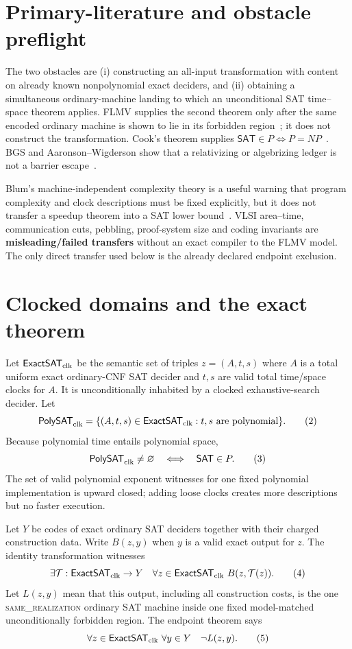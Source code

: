 \documentclass[11pt]{article}
\newcommand{\SAT}{\mathsf{SAT}}
\newcommand{\ExactSAT}{\mathsf{ExactSAT}_{\rm clk}}
\newcommand{\PolySAT}{\mathsf{PolySAT}_{\rm clk}}
\newcommand{\same}{\textsc{same\_realization}}
\begin{document}
\section{Primary-literature and obstacle preflight}
The two obstacles are (i) constructing an all-input transformation with
content on already known nonpolynomial exact deciders, and (ii) obtaining a
simultaneous ordinary-machine landing to which an unconditional SAT
time--space theorem applies.  FLMV supplies the second theorem only after the
same encoded ordinary machine is shown to lie in its forbidden
region~\cite{FLMV05}; it does not construct the transformation.  Cook's
theorem supplies $\SAT\in P\Leftrightarrow P=NP$~\cite{Cook71}.  BGS and
Aaronson--Wigderson show that a relativizing or algebrizing ledger is not a
barrier escape~\cite{BGS75,AW09}.

Blum's machine-independent complexity theory is a useful warning that program
complexity and clock descriptions must be fixed explicitly, but it does not
transfer a speedup theorem into a SAT lower bound~\cite{Blum67}.  VLSI
area--time, communication cuts, pebbling, proof-system size and coding
invariants are \textbf{misleading/failed transfers} without an exact compiler
to the FLMV model.  The only direct transfer used below is the already
declared endpoint exclusion.

\section{Clocked domains and the exact theorem}
Let $\ExactSAT$ be the semantic set of triples
$z=(A,t,s)$ where $A$ is a total uniform exact ordinary-CNF SAT decider and
$t,s$ are valid total time/space clocks for $A$.  It is unconditionally
inhabited by a clocked exhaustive-search decider.  Let
\[
 \PolySAT=\{(A,t,s)\in\ExactSAT:t,s\text{ are polynomial}\}. \tag{2}
\]
Because polynomial time entails polynomial space,
\[
 \PolySAT\ne\varnothing\quad\Longleftrightarrow\quad\SAT\in P. \tag{3}
\]
The set of valid polynomial exponent witnesses for one fixed polynomial
implementation is upward closed; adding loose clocks creates more
descriptions but no faster execution.

Let $Y$ be codes of exact ordinary SAT deciders together with their charged
construction data.  Write $B(z,y)$ when $y$ is a valid exact output for
$z$.  The identity transformation witnesses
\[
 \exists\mathcal T:\ExactSAT\to Y\quad
 \forall z\in\ExactSAT\ B(z,\mathcal T(z)). \tag{4}
\]
Let $L(z,y)$ mean that this output, including all construction costs, is the
one \same{} ordinary SAT machine inside one fixed model-matched
unconditionally forbidden region.  The endpoint theorem says
\[
 \forall z\in\ExactSAT\ \forall y\in Y\quad \neg L(z,y). \tag{5}
\]
\end{document}
